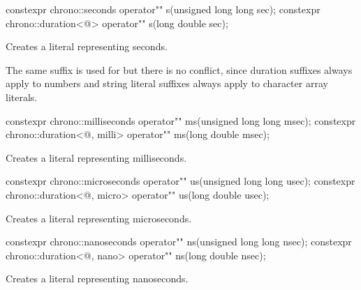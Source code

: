 \documentclass[ebook,11pt,article]{memoir}
\begin{document}
\begin{itemdecl}
constexpr 
chrono::seconds operator"" s(unsigned long long sec);
constexpr 
chrono::duration<@\unspec@> operator"" s(long double sec);
\end{itemdecl}

\begin{itemdescr}
\pnum
\effects
Creates a  literal representing  seconds. 

\enternote
The same suffix  is used for  but there is no conflict, since duration suffixes always apply to numbers and string literal suffixes always apply to character array literals.
\exitnote
\end{itemdescr}

\begin{itemdecl}
constexpr 
chrono::milliseconds operator"" ms(unsigned long long msec);
constexpr 
chrono::duration<@\unspec@, milli> operator"" ms(long double msec);
\end{itemdecl}

\begin{itemdescr}
\pnum
\effects
Creates a  literal representing  milliseconds. 
\end{itemdescr}

\begin{itemdecl}
constexpr 
chrono::microseconds operator"" us(unsigned long long usec);
constexpr 
chrono::duration<@\unspec@, micro> operator"" us(long double usec);
\end{itemdecl}

\begin{itemdescr}
\pnum
\effects
Creates a  literal representing  microseconds. 
\end{itemdescr}

\begin{itemdecl}
constexpr 
chrono::nanoseconds operator"" ns(unsigned long long nsec);
constexpr 
chrono::duration<@\unspec@, nano> operator"" ns(long double nsec);
\end{itemdecl}

\begin{itemdescr}
\pnum
\effects
Creates a  literal representing  nanoseconds. 
\end{itemdescr}
\end{document}

